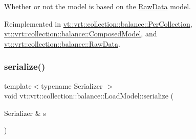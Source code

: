 Whether or not the model is based on the \hyperlink{structvt_1_1vrt_1_1collection_1_1balance_1_1_raw_data}{Raw\+Data} model. 



Reimplemented in \hyperlink{structvt_1_1vrt_1_1collection_1_1balance_1_1_per_collection_a9b40a4b1370e174fc18df75c5256dbd2}{vt\+::vrt\+::collection\+::balance\+::\+Per\+Collection}, \hyperlink{classvt_1_1vrt_1_1collection_1_1balance_1_1_composed_model_aec716d7c9de7e8e8601e0baae6c2b51e}{vt\+::vrt\+::collection\+::balance\+::\+Composed\+Model}, and \hyperlink{structvt_1_1vrt_1_1collection_1_1balance_1_1_raw_data_a9c078ffb396d431b9625bffcd13d6ec2}{vt\+::vrt\+::collection\+::balance\+::\+Raw\+Data}.

\mbox{\label{structvt_1_1vrt_1_1collection_1_1balance_1_1_load_model_a52e2210225947697a235b75c385eb104}} 
\subsubsection{\texorpdfstring{serialize()}{serialize()}}
{\footnotesize\ttfamily template$<$typename Serializer $>$ \\
void vt\+::vrt\+::collection\+::balance\+::\+Load\+Model\+::serialize (\begin{DoxyParamCaption}\item[{Serializer \&}]{s }\end{DoxyParamCaption})\hspace{0.3cm}{\ttfamily [inline]}}

\mbox{\label{structvt_1_1vrt_1_1collection_1_1balance_1_1_load_model_a3de0ef4b35fbdc6e0cb899cfb3cc20ec}} 
